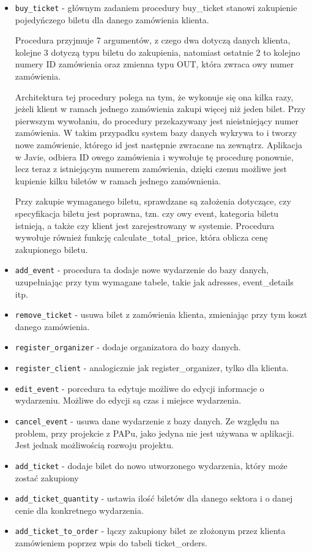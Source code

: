 \documentclass[12pt]{article}
\begin{document}
        \begin{itemize}
            \item {\tt buy\_ticket} - głównym zadaniem procedury buy\_ticket stanowi zakupienie pojedyńczego biletu dla danego zamówienia klienta.
            
            Procedura przyjmuje 7 argumentów, z czego dwa dotyczą danych klienta, kolejne 3 dotyczą typu biletu do zakupienia, natomiast ostatnie 2 to kolejno numery ID zamówienia oraz zmienna typu OUT, która zwraca owy numer zamówienia.
            
            Architektura tej procedury polega na tym, że wykonuje się ona kilka razy, jeżeli klient w ramach jednego zamówienia zakupi więcej niż jeden bilet. Przy pierwszym wywołaniu, do procedury przekazywany jest nieistniejący numer zamówienia. W takim przypadku system bazy danych wykrywa to i tworzy nowe zamówienie, którego id jest następnie zwracane na zewnątrz. Aplikacja w Javie, odbiera ID owego zamówienia i wywołuje tę procedurę ponownie, lecz teraz z istniejącym numerem zamówienia, dzięki czemu możliwe jest kupienie kilku biletów w ramach jednego zamównienia.

            Przy zakupie wymaganego biletu, sprawdzane są założenia dotyczące, czy specyfikacja biletu jest poprawna, tzn. czy owy event, kategoria biletu istnieją, a także czy klient jest zarejestrowany w systemie. Procedura wywołuje również funkcję calculate\_total\_price, która oblicza cenę zakupionego biletu.
            
            \item {\tt add\_event} - procedura ta dodaje nowe wydarzenie do bazy danych, uzupełniając przy tym wymagane tabele, takie jak adresses, event\_details itp.
            \item {\tt remove\_ticket} - usuwa bilet z zamówienia klienta, zmieniając przy tym koszt danego zamówienia.
            \item {\tt register\_organizer} - dodaje organizatora do bazy danych.
            \item {\tt register\_client} - analogicznie jak register\_organizer, tylko dla klienta.
            \item {\tt edit\_event} - porcedura ta edytuje możliwe do edycji informacje o wydarzeniu. Możliwe do edycji są czas i miejsce wydarzenia.
            \item {\tt cancel\_event} - usuwa dane wydarzenie z bazy danych. Ze względu na problem, przy projekcie z PAPu, jako jedyna nie jest używana w aplikacji. Jest jednak możliwością rozwoju projektu.
            \item {\tt add\_ticket} - dodaje bilet do nowo utworzonego wydarzenia, który może zostać zakupiony
            \item {\tt add\_ticket\_quantity} - ustawia ilość biletów dla danego sektora i o danej cenie dla konkretnego wydarzenia.
            \item {\tt add\_ticket\_to\_order} - łączy zakupiony bilet ze złożonym przez klienta zamówieniem poprzez wpis do tabeli ticket\_orders.
        \end{itemize}
        
\end{document}
